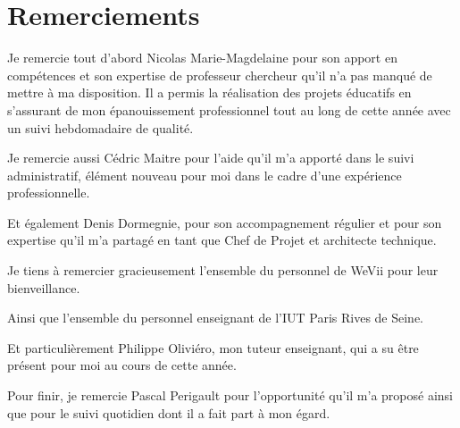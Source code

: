 \chapter*{Remerciements}

Je remercie tout d’abord Nicolas Marie-Magdelaine pour son apport en compétences et son expertise de professeur chercheur qu’il n’a pas manqué de mettre à ma disposition.
Il a permis la réalisation des projets éducatifs en s’assurant de mon épanouissement professionnel tout au long de cette année avec un suivi hebdomadaire de qualité.

\bigskip

Je remercie aussi Cédric Maitre pour l’aide qu’il m’a apporté dans le suivi administratif, élément nouveau pour moi dans le cadre d’une expérience professionnelle.

\bigskip

Et également Denis Dormegnie, pour son accompagnement régulier et pour son expertise qu’il m’a partagé en tant que Chef de Projet et architecte technique.
\bigskip

Je tiens à remercier gracieusement l’ensemble du personnel de WeVii pour leur bienveillance.

\bigskip

Ainsi que l’ensemble du personnel enseignant de l’IUT Paris Rives de Seine.

\bigskip

Et particulièrement Philippe Oliviéro, mon tuteur enseignant, qui a su être présent pour moi au cours de cette année.

\bigskip

Pour finir, je remercie Pascal Perigault pour l’opportunité qu’il m’a proposé ainsi que pour le suivi quotidien dont il a fait part à mon égard.

\vfill %

\clearpage
